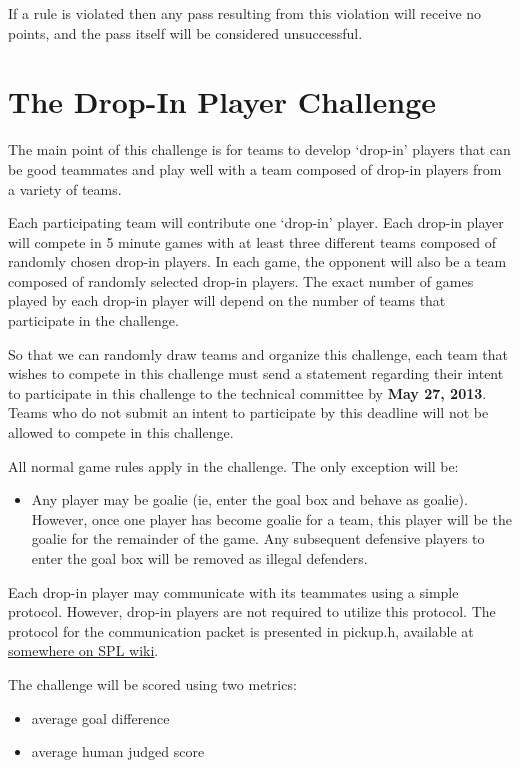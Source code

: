 \documentclass{article}
\begin{document}
If a rule is violated then any pass resulting from this violation will receive no points, and the pass itself will be considered unsuccessful.


\section{The Drop-In Player Challenge}
\label{sec:dropIn}
The main point of this challenge is for teams to develop `drop-in' players that can be good teammates and play well with a team composed of drop-in players from a variety of teams.

Each participating team will contribute one `drop-in' player.  Each drop-in player will compete in 5 minute games with at least three different teams composed of randomly chosen drop-in players.  In each game, the opponent will also be a team composed of randomly selected drop-in players.  The exact number of games played by each drop-in player will depend on the number of teams that participate in the challenge.

So that we can randomly draw teams and organize this challenge, each team that wishes to compete in this challenge must send a statement regarding their intent to participate in this challenge to the technical committee by \textbf{May 27, 2013}.  Teams who do not submit an intent to participate by this deadline will not be allowed to compete in this challenge.

All normal game rules apply in the challenge.  The only exception will be:
\begin{itemize}
\item Any player may be goalie (ie, enter the goal box and behave as goalie).  However, once one player has become goalie for a team, this player will be the goalie for the remainder of the game.  Any subsequent defensive players to enter the goal box will be removed as illegal defenders.
\end{itemize}

Each drop-in player may communicate with its teammates using a simple protocol.  However, drop-in players are not required to utilize this protocol.  The protocol for the communication packet is presented in pickup.h, available at \url{somewhere on SPL wiki}.

The challenge will be scored using two metrics: 
\begin{itemize}
\item average goal difference
\item average human judged score
\end{itemize}
\end{document}
